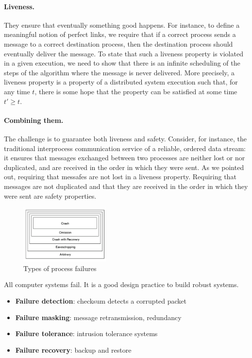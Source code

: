 \documentclass{book}
\begin{document}
\paragraph{Liveness.}
They ensure that eventually something good happens. 
For instance, to define a meaningful notion of perfect links, we require that if a correct process sends a message to a correct destination process, then the destination process should eventually deliver the message.
To state that such a liveness property is violated in a given execution, we need to show that there is an infinite scheduling of the steps of the algorithm where the message is never delivered.
\newline
More precisely, a liveness property is a property of a distributed system execution such that, for any time $t$, there is some hope that the property can be satisfied at some time $t' \geq t$.

\paragraph{Combining them.}
The challenge is to guarantee both liveness and safety.
Consider, for instance, the traditional interprocess communication service of a reliable, ordered data stream: it ensures that messages exchanged between two processes are neither lost or nor duplicated, and are received in the order in which they were sent.
As we pointed out, requiring that messafes are not lost in a liveness property.
Requiring that messages are not duplicated and that they are received in the order in which they were sent are safety properties.

\begin{figure}[H]
    \centering
    \includegraphics[width=0.4\textwidth]{Immagini/7.png}
    \caption{Types of process failures}
\end{figure}

\begin{tcolorbox}[colback=red!5!white,colframe=red!75!black,title=Failures]
All computer systems fail. It is a good design practice to build robust systems.

\begin{itemize}
    \item \textbf{Failure detection}: checksum detects a corrupted packet
    \item \textbf{Failure masking}: message retransmission, redundancy
    \item \textbf{Failure tolerance}: intrusion tolerance systems
    \item \textbf{Failure recovery}: backup and restore
\end{itemize}
\end{tcolorbox}
\end{document}
